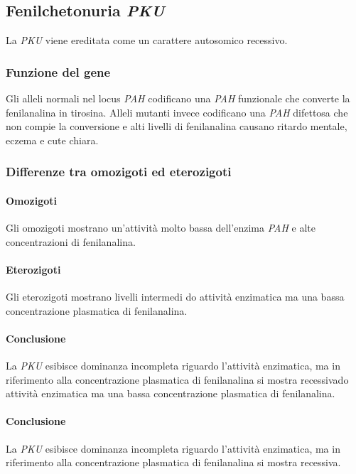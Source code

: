 	\subsection{Fenilchetonuria \emph{PKU}}
	La \emph{PKU} viene ereditata come un carattere autosomico recessivo. 

		\subsubsection{Funzione del gene}
		Gli alleli normali nel locus \emph{PAH} codificano una \emph{PAH} funzionale che converte la fenilanalina in tirosina. 
		Alleli mutanti invece codificano una \emph{PAH} difettosa che non compie la conversione e alti livelli di fenilanalina causano ritardo mentale, eczema e cute chiara. 

		\subsubsection{Differenze tra omozigoti ed eterozigoti}

			\paragraph{Omozigoti}
			Gli omozigoti mostrano un'attivit\`a molto bassa dell'enzima \emph{PAH} e alte concentrazioni di fenilanalina.
			
			\paragraph{Eterozigoti}
			Gli eterozigoti mostrano livelli intermedi do attivit\`a enzimatica ma una bassa concentrazione plasmatica di fenilanalina. 

			\paragraph{Conclusione}
			La \emph{PKU} esibisce dominanza incompleta riguardo l'attivit\`a enzimatica, ma in riferimento alla concentrazione plasmatica di fenilanalina si mostra recessivado attivit\`a enzimatica ma una bassa concentrazione plasmatica di fenilanalina. 
			
			\paragraph{Conclusione}
			La \emph{PKU} esibisce dominanza incompleta riguardo l'attivit\`a enzimatica, ma in riferimento alla concentrazione plasmatica di fenilanalina si mostra recessiva.
	
